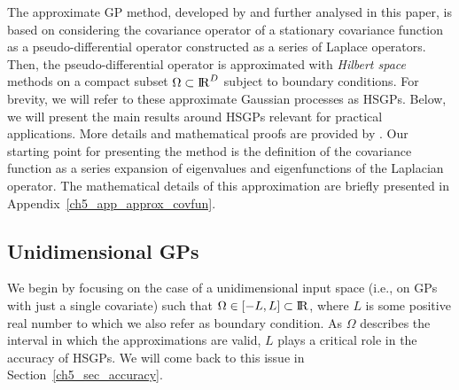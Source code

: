 \documentclass[onecolumn,a4paper,11pt]{article}
\begin{document}
The approximate GP method, developed by \citet{solin2018hilbert} and further analysed in this paper, is based on considering the covariance operator of a stationary covariance function as a pseudo-differential operator constructed as a series of Laplace operators. Then, the pseudo-differential operator is approximated with \emph{Hilbert space} methods on a compact subset $\Omega \subset {\rm I\!R}^D$ subject to boundary conditions. For brevity, we will refer to these approximate Gaussian processes as HSGPs. Below, we will present the main results around HSGPs relevant for practical applications. More details and mathematical proofs are provided by \citet{solin2018hilbert}. Our starting point for presenting the method is the definition of the covariance function as a series expansion of eigenvalues and eigenfunctions of the Laplacian operator. The mathematical details of this approximation are briefly presented in Appendix~\ref{ch5_app_approx_covfun}.

\subsection{Unidimensional GPs} \label{ch5_sec_method_uni}

We begin by focusing on the case of a unidimensional input space (i.e., on GPs with just a single covariate) such that $\Omega \in [-L,L] \subset {\rm I\!R}$, where $L$ is some positive real number to which we also refer as boundary condition. As $\Omega$ describes the interval in which the approximations are valid, $L$ plays a critical role in the accuracy of HSGPs. We will come back to this issue in Section~\ref{ch5_sec_accuracy}.
\end{document}
